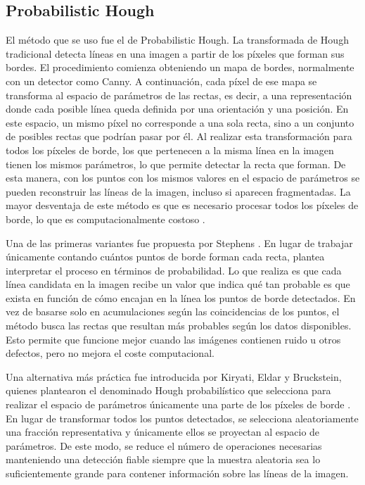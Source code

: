 \subsection{Probabilistic Hough}
El método que se uso fue el de Probabilistic Hough. La transformada de Hough tradicional detecta líneas en una imagen a partir de los píxeles que forman sus bordes. El procedimiento comienza obteniendo un mapa de bordes, normalmente con un detector como Canny. A continuación, cada píxel de ese mapa se transforma al espacio de parámetros de las rectas, es decir, a una representación donde cada posible línea queda definida por una orientación y una posición. En este espacio, un mismo píxel no corresponde a una sola recta, sino a un conjunto de posibles rectas que podrían pasar por él. Al realizar esta transformación para todos los píxeles de borde, los que pertenecen a la misma línea en la imagen tienen los mismos parámetros, lo que permite detectar la recta que forman. De esta manera, con los puntos con los mismos valores en el espacio de parámetros se pueden reconstruir las líneas de la imagen, incluso si aparecen fragmentadas. La mayor desventaja de este método es que es necesario procesar todos los píxeles de borde, lo que es computacionalmente costoso \cite{duda1972hough}.

Una de las primeras variantes fue propuesta por Stephens \cite{stephens1991pht}. En lugar de trabajar únicamente contando cuántos puntos de borde forman cada recta, plantea interpretar el proceso en términos de probabilidad. Lo que realiza es que cada línea candidata en la imagen recibe un valor que indica qué tan probable es que exista en función de cómo encajan en la línea los puntos de borde detectados. En vez de basarse solo en acumulaciones según las coincidencias de los puntos, el método busca las rectas que resultan más probables según los datos disponibles. Esto permite que funcione mejor cuando las imágenes contienen ruido u otros defectos, pero no mejora el coste computacional.

Una alternativa más práctica fue introducida por Kiryati, Eldar y Bruckstein, quienes plantearon el denominado Hough probabilístico que selecciona para realizar el espacio de parámetros únicamente una parte de los píxeles de borde \cite{kiryati1991pht}. En lugar de transformar todos los puntos detectados, se selecciona aleatoriamente una fracción representativa y únicamente ellos se proyectan al espacio de parámetros. De este modo, se reduce el número de operaciones necesarias manteniendo una detección fiable siempre que la muestra aleatoria sea lo suficientemente grande para contener información sobre las líneas de la imagen.  

